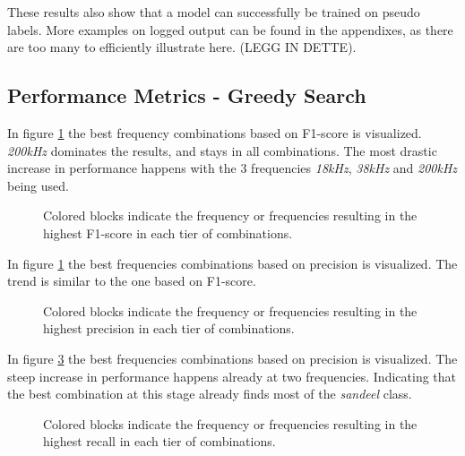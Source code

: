     
    These results also show that a model can successfully be trained on pseudo labels. More examples on logged output can be found in the appendixes, as there are too many to efficiently illustrate here. (LEGG IN DETTE). 
    
    \subsection{Performance Metrics - Greedy Search}
        In figure \ref{increasing_freq_f1_score_fig} the best frequency combinations based on F1-score is visualized. \textit{200kHz} dominates the results, and stays in all combinations. The most drastic increase in performance happens with the 3 frequencies \textit{18kHz}, \textit{38kHz} and \textit{200kHz} being used.
        \begin{figure}[H]
            \centering
            
            \caption[Best frequency combination - F1-score]{Colored blocks indicate the frequency or frequencies resulting in the highest F1-score in each tier of combinations.}
          	\medskip 
            \label{increasing_freq_f1_score_fig}
        \end{figure}

        In figure \ref{increasing_freq_f1_score_fig} the best frequencies combinations based on precision is visualized. The trend is similar to the one based on F1-score.
        \begin{figure}[H]
            \centering
            
            \caption[Best frequency combination - Precision]{Colored blocks indicate the frequency or frequencies resulting in the highest precision in each tier of combinations.}
          	\medskip 
            \label{increasing_freq_precision_score_fig}
        \end{figure}
        
        In figure \ref{increasing_freq_recall_score_fig} the best frequencies combinations based on precision is visualized. The steep increase in performance happens already at two frequencies. Indicating that the best combination at this stage already finds most of the \textit{sandeel} class.
        \begin{figure}[H]
            \centering
            
            \caption[Best frequency combination - Recall]{Colored blocks indicate the frequency or frequencies resulting in the highest recall in each tier of combinations.}
          	\medskip 
            \label{increasing_freq_recall_score_fig}
        \end{figure}

